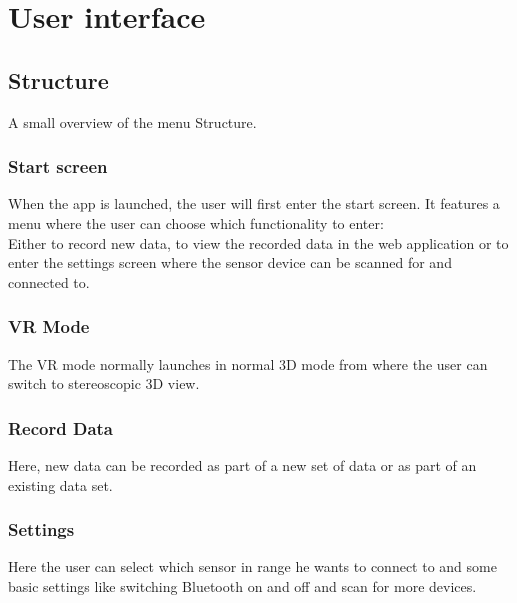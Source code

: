 \section{User interface}

\subsection{Structure}

A small overview of the menu Structure.

\subsubsection{Start screen}

When the app is launched, the user will first enter the start screen. It features a menu where the user can choose which functionality to enter: \\
Either to record new data, to view the recorded data in the web application or to enter the settings screen where the sensor device can be scanned for and connected to.


\subsubsection{VR Mode}

The VR mode normally launches in normal 3D mode from where the user can switch to stereoscopic 3D view.


\subsubsection{Record Data}

Here, new data can be recorded as part of a new set of data or as part of an existing data set.



\subsubsection{Settings}

Here the user can select which sensor in range he wants to connect to and some basic settings like switching Bluetooth on and off and scan for more devices.




